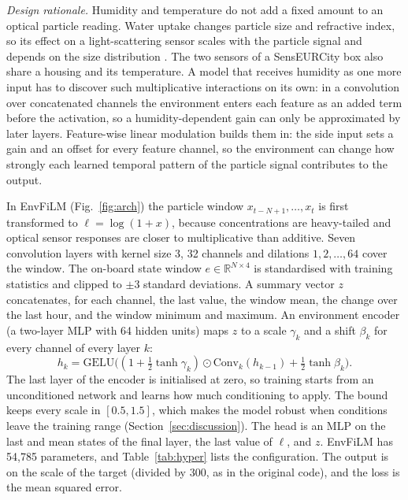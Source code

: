 \documentclass[journal]{IEEEtran}
\begin{document}
\textit{Design rationale.} Humidity and temperature do not add a fixed amount to an optical particle reading. Water
uptake changes particle size and refractive index, so its effect on a light-scattering sensor scales with the particle
signal and depends on the size distribution \cite{diantonio2018,crilley2018,petters2007}. The two sensors of a
SensEURCity box also share a housing and its temperature. A model that receives humidity as one more input has to
discover such multiplicative interactions on its own: in a convolution over concatenated channels the environment
enters each feature as an added term before the activation, so a humidity-dependent gain can only be approximated by
later layers. Feature-wise linear modulation \cite{perez2018} builds them in:
the side input sets a gain and an offset for every feature channel, so the environment can change how strongly each
learned temporal pattern of the particle signal contributes to the output.

In EnvFiLM (Fig.~\ref{fig:arch}) the particle window $x_{t-N+1},\dots,x_t$ is first transformed to
$\ell = \log(1 + x)$,
because concentrations are heavy-tailed and optical sensor responses are closer to multiplicative than additive. Seven
convolution layers with kernel size 3, 32 channels and dilations $1, 2, \dots, 64$ cover the window. The on-board state
window $e \in \mathbb{R}^{N\times 4}$ is standardised with training statistics and clipped to $\pm3$ standard
deviations. A summary vector $z$ concatenates, for each channel, the last value, the window mean, the change over the
last hour, and the window minimum and maximum. An environment encoder (a two-layer MLP with 64 hidden units) maps $z$ to
a scale $\gamma_k$ and a shift $\beta_k$ for every channel of every layer $k$:
\begin{equation}
h_k = \mathrm{GELU}\big( (1 + \tfrac12\tanh \gamma_k) \odot \mathrm{Conv}_k(h_{k-1}) + \tfrac12 \tanh \beta_k \big).
\end{equation}
The last layer of the encoder is initialised at zero, so training starts from an unconditioned network and learns how
much conditioning to apply. The bound keeps every scale in $[0.5, 1.5]$, which makes the model robust when conditions
leave the training range (Section~\ref{sec:discussion}). The head is an MLP on the last and mean states of the final layer,
the last value of $\ell$, and $z$. EnvFiLM has 54,785 parameters, and Table~\ref{tab:hyper} lists the configuration.
The output is on the scale of the target (divided by 300, as in the original code), and the loss is the mean squared
error.
\end{document}
